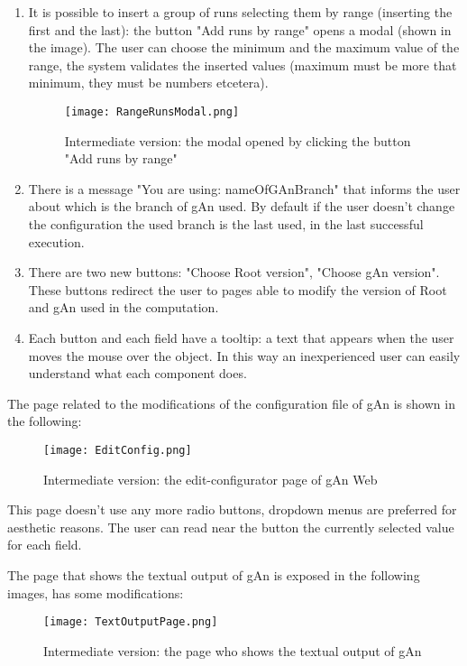 \begin{enumerate}
\item It is possible to insert a group of runs selecting them by range (inserting the first and the last): the button "Add runs by range" opens a modal (shown in the image). The user can choose the minimum and the maximum value of the range, the system validates the inserted values (maximum must be more that minimum, they must be numbers etcetera).

\begin{figure}[H]
\centering
\texttt{[image: RangeRunsModal.png]}  
\caption{Intermediate version: the modal opened by clicking the button "Add runs by range"}
\end{figure}

\item There is a message "You are using: nameOfGAnBranch" that informs the user about which is the branch of gAn used. By default if the user doesn't change the configuration the used branch is the last used, in the last successful execution.

\item There are two new buttons: "Choose Root version", "Choose gAn version". These buttons redirect the user to pages able to modify the version of Root and gAn used in the computation.
 
\item Each button and each field have a tooltip: a text that appears when the user moves the mouse over the object. In this way an inexperienced user can easily understand what each component does.  

\end{enumerate}


The page related to the modifications of the configuration file of gAn is shown in the following:

\begin{figure}[H]
\centering
\texttt{[image: EditConfig.png]} 
\caption{Intermediate version: the edit-configurator page of gAn Web}
\end{figure}

This page doesn't use any more radio buttons, dropdown menus are preferred for aesthetic reasons. The user can read near the button the currently selected value for each field. 

\newpage

The page that shows the textual output of gAn is exposed in the following images, has some modifications:

\begin{figure}[H]
\centering
\texttt{[image: TextOutputPage.png]} 
\caption{Intermediate version: the page who shows the textual output of gAn}
\end{figure}


